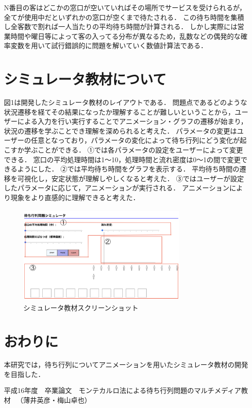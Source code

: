 \documentclass[twocolumn,10pt,a4j]{ltjsarticle}
\begin{document}
N番目の客はどこかの窓口が空いていればその場所でサービスを受けられるが，全てが使用中だといずれかの窓口が空くまで待たされる．
この待ち時間を集積し全客数で割れば一人当たりの平均待ち時間が計算される．
しかし実際には営業時間や曜日等によって客の入ってる分布が異なるため，乱数などの偶発的な確率変数を用いて試行錯誤的に問題を解いていく数値計算法である．


\section{シミュレータ教材について}
図1は開発したシミュレータ教材のレイアウトである．
問題点であるどのような状況遷移を経てその結果になったか理解することが難しいということから，ユーザーによる入力を行い実行することでアニメーション・グラフの遷移が始まり，状況の遷移を学ぶことでき理解を深められると考えた．
パラメータの変更はユーザーの任意となっており，パラメータの変化によって待ち行列にどう変化が起こすか学ぶことができる．
①では各パラメータの設定をユーザーによって変更できる．
窓口の平均処理時間は1〜10，処理時間と流れ密度は0〜1の間で変更できるようにした．
②では平均待ち時間をグラフを表示する．
平均待ち時間の遷移を可視化し，安定状態が理解しやしくなると考えた．
③ではユーザーが設定したパラメータに応じて，アニメーションが実行される．
アニメーションにより現象をより直感的に理解できると考えた．

\begin{figure}[h]
\begin{center}
\includegraphics[clip,width=85mm,height=50mm]{figures/layout.pdf}
\end{center}
\caption{シミュレータ教材スクリーンショット}
\label{fig:教科書}
\end{figure}

\section{おわりに}
本研究では，待ち行列についてアニメーションを用いたシミュレータ教材の開発を目指した．

\begin{thebibliography}{99}
平成16年度　卒業論文　モンテカルロ法による待ち行列問題のマルチメディア教材 　（薄井英彦・梅山卓也）
\end{thebibliography}
\end{document}
